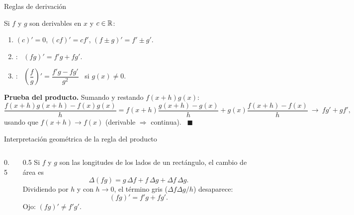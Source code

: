 \documentclass[10pt,aspectratio=169]{beamer}
\begin{document}
\begin{frame}{Reglas de derivación}
  \begin{teorema}
    Si $f$ y $g$ son derivables en $x$ y $c\in\mathbb{R}$:
    \begin{enumerate}
      \item $(c)'=0$, \quad $(cf)'=cf'$, \quad $(f\pm g)'=f'\pm g'$.
      \item {}: \ $(fg)'=f'g+fg'$.
      \item {}: \ $\left(\dfrac fg\right)'=\dfrac{f'g-fg'}{g^2}$ \ si $g(x)\neq0$.
    \end{enumerate}
  \end{teorema}
  \textbf{Prueba del producto.} Sumando y restando $f(x+h)g(x)$:
  \[ \frac{f(x+h)g(x+h)-f(x)g(x)}{h}=f(x+h)\frac{g(x+h)-g(x)}{h}+g(x)\frac{f(x+h)-f(x)}{h}\ \to\ fg'+gf', \]
  usando que $f(x+h)\to f(x)$ (derivable $\Rightarrow$ continua). \ $\blacksquare$
\end{frame}

\begin{frame}{Interpretación geométrica de la regla del producto}
  \begin{columns}
    \begin{column}{0.5\textwidth}
      \centering
    \end{column}
    \begin{column}{0.5\textwidth}
      Si $f$ y $g$ son las longitudes de los lados de un rectángulo, el cambio de área es
      \[ \Delta(fg)=g\,\Delta f+f\,\Delta g+\Delta f\,\Delta g. \]
      Dividiendo por $h$ y con $h\to0$, el término gris ($\Delta f\Delta g/h$) desaparece:
      \[ (fg)'=f'g+fg'. \]
      \alert{Ojo:} $(fg)'\neq f'g'$.
    \end{column}
  \end{columns}
\end{frame}
\end{document}
